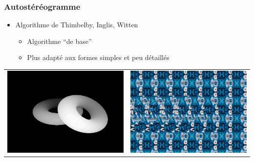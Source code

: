 \documentclass{beamer}
\begin{document}
\begin{frame}
\frametitle{Autostéréogramme}
\begin{itemize}[label=$\bullet$]
\item Algorithme de Thimbelby, Inglis, Witten \cite{stereogram}
	\begin{itemize}[label=$\circ$]
	\item Algorithme ``de base''
	\item Plus adapté aux formes simples et peu détaillés
	\end{itemize}
\end{itemize}

\begin{tabular}{l|r}
\centering
\includegraphics[scale=0.22]{donutdepth.png}
&
\centering
\includegraphics[scale=0.22]{donut1.png}
\end{tabular}

\end{frame}
\end{document}
